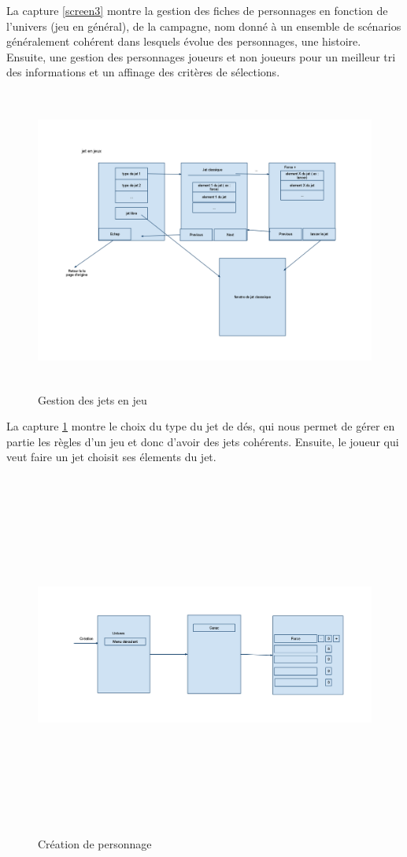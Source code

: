 \documentclass[11pt,a4paper]{article}
\begin{document}
La capture \ref{screen3} montre la gestion des fiches de personnages en fonction
de l'univers (jeu en général), de la campagne, nom donné à un ensemble de
scénarios généralement cohérent dans lesquels évolue des personnages, une
histoire. Ensuite, une gestion des personnages joueurs et non joueurs pour un
meilleur tri des informations et un affinage des critères de sélections.

\begin{figure}[h]
  	
\includegraphics[height=10cm,width=12cm]{image/screen4.png}
  		\caption{Gestion des jets en jeu}
  		\label{screen4}
\end{figure}

La capture \ref{screen4} montre le choix du type du jet de dés, qui nous permet
de gérer en partie les règles d'un jeu et donc d'avoir des jets cohérents.
Ensuite, le joueur qui veut faire un jet choisit ses élements du jet.

\begin{figure}[h]
  	
\includegraphics[height=12cm,width=15cm]{image/screen5.png}
  		\caption{Création de personnage}
  		\label{screen5}
\end{figure}
\end{document}
